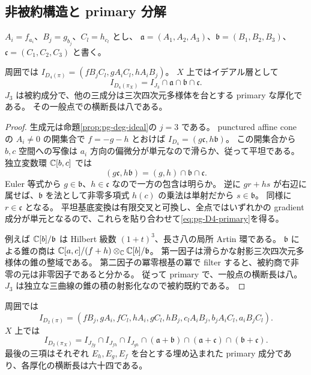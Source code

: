 \subsection{非被約構造と primary 分解}
$A_i=f_{a_i}$、$B_j=g_{b_j}$、$C_l=h_{c_l}$ とし、
$\mathfrak a=(A_1,A_2,A_3)$、$\mathfrak b=(B_1,B_2,B_3)$、$\mathfrak c=(C_1,C_2,C_3)$ と書く。
\begin{proposition}\label{prop:pg-D4-primary}
周囲では $I_{D_4(\pi)}=(fB_jC_l,gA_iC_l,hA_iB_j)$。
$X$ 上ではイデアル層として
\begin{equation}
I_{D_4(\pi_X)}=I_{J_3}\cap\mathfrak a\cap\mathfrak b\cap\mathfrak c.\label{eq:pg-D4-primary}
\end{equation}
$J_3$ は被約成分で、他の三成分は三次四次元多様体を台とする primary な厚化である。
その一般点での横断長は八である。
\end{proposition}
\begin{proof}
生成元は命題\ref{prop:pg-deg-ideal}の $j=3$ である。
punctured affine cone の $A_i\neq0$ の開集合で $f=-g-h$ とおけば
$I_{D_4}=(g\mathfrak c,h\mathfrak b)$。
この開集合から $b,c$ 空間への写像は $a_i$ 方向の偏微分が単元なので滑らか、従って平坦である。
独立変数環 $\mathbb C[b,c]$ では
\begin{equation}
(g\mathfrak c,h\mathfrak b)=(g,h)\cap\mathfrak b\cap\mathfrak c.
\end{equation}
Euler 等式から $g\in\mathfrak b$、$h\in\mathfrak c$ なので一方の包含は明らか。
逆に $gr+hs$ が右辺に属せば、$\mathfrak b$ を法として非零多項式 $h(c)$ の乗法は単射だから $s\in\mathfrak b$。
同様に $r\in\mathfrak c$ となる。
平坦基底変換は有限交叉と可換し、全点ではいずれかの gradient 成分が単元となるので、これらを貼り合わせて\eqref{eq:pg-D4-primary}を得る。

例えば $\mathbb C[b]/\mathfrak b$ は Hilbert 級数 $(1+t)^3$、長さ八の局所 Artin 環である。
$\mathfrak b$ による錐の商は
$\mathbb C[a,c]/(f+h)\otimes_\mathbb C\mathbb C[b]/\mathfrak b$。
第一因子は滑らかな射影三次四次元多様体の錐の整域である。
第二因子の冪零根基の冪で filter すると、被約商で非零の元は非零因子であると分かる。
従って primary で、一般点の横断長は八。
$J_3$ は独立な三曲線の錐の積の射影化なので被約既約である。
\end{proof}
\begin{proposition}\label{prop:pg-D2-primary}
周囲では
\begin{equation}
I_{D_2(\pi)}=(fB_j,gA_i,fC_l,hA_i,gC_l,hB_j,
 c_lA_iB_j,b_jA_iC_l,a_iB_jC_l).
\end{equation}
$X$ 上では
\begin{equation}
I_{D_2(\pi_X)}=I_{J_{fg}}\cap I_{J_{fh}}\cap I_{J_{gh}}
\cap(\mathfrak a+\mathfrak b)\cap(\mathfrak a+\mathfrak c)\cap(\mathfrak b+\mathfrak c).
\label{eq:pg-D2-primary}
\end{equation}
最後の三項はそれぞれ $E_h,E_g,E_f$ を台とする埋め込まれた primary 成分であり、各厚化の横断長は六十四である。
\end{proposition}

